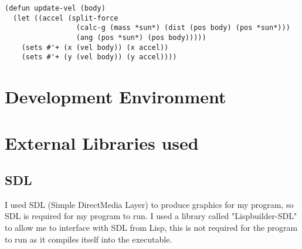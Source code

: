 \begin{lstlisting}
(defun update-vel (body)
  (let ((accel (split-force 
                 (calc-g (mass *sun*) (dist (pos body) (pos *sun*)))
                 (ang (pos *sun*) (pos body)))))
    (sets #'+ (x (vel body)) (x accel))
    (sets #'+ (y (vel body)) (y accel))))
\end{lstlisting}

\section{Development Environment}

\section{External Libraries used}
\subsection{SDL}
I used SDL (Simple DirectMedia Layer) to produce graphics for my program, so SDL
is required for my program to run. I used a library called "Lispbuilder-SDL" to
allow me to interface with SDL from Lisp, this is not required for the program
to run as it compiles itself into the executable.
